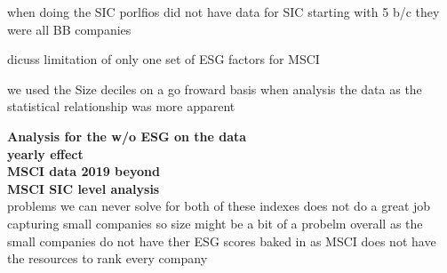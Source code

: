 when doing the SIC porlfios did not have data for SIC starting with 5 b/c they were all BB companies 
 
 
 
 dicuss limitation of only one set of ESG factors for MSCI 
 
 we used the Size deciles on a go froward basis when analysis the data as the statistical relationship was more apparent 
 
 \textbf{Analysis for the w/o ESG on the data}\\
 \textbf{yearly effect}\\
 
 \textbf{MSCI data 2019 beyond}\\
 
 \textbf{MSCI SIC level analysis}\\
 
 problems we can never solve for both of these indexes does not do a great job capturing small companies so size might be a bit of a probelm overall as the small companies do not have ther ESG scores baked in as MSCI does not have the resources to rank every company